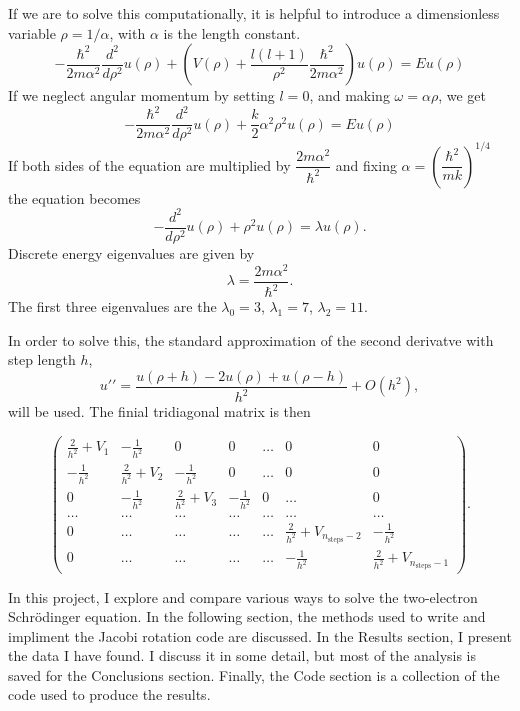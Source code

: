 \documentclass[11pt]{article}
\begin{document}
    If we are to solve this computationally, it is helpful to introduce a dimensionless variable $\rho = 1/\alpha$, with $\alpha$ is the length constant. 
    \[ -\dfrac{\hbar^2}{2m\alpha^2} \dfrac{d^2}{d\rho^2} u(\rho) + \left( V(\rho) + \dfrac{l(l+1)}{\rho^2} \dfrac{\hbar^2}{2m\alpha^2} \right) u(\rho) = Eu(\rho) \]
    If we neglect angular momentum by setting $l=0$, and making $\omega = \alpha \rho$, we get
    \[ -\dfrac{\hbar^2}{2m\alpha^2} \dfrac{d^2}{d\rho^2} u(\rho) + \dfrac{k}{2} \alpha^2 \rho^2 u(\rho) = Eu(\rho) \]
    If both sides of the equation are multiplied by $\dfrac{2m\alpha^2}{\hbar^2}$ and fixing $\alpha = \left( \dfrac{\hbar^2}{mk} \right)^{1/4}$ the equation becomes
    \[ -\dfrac{d^2}{d\rho^2} u(\rho)+ \rho^2 u(\rho) = \lambda u(\rho). \]
    Discrete energy eigenvalues are given by
    \[ \lambda = \dfrac{2m\alpha^2}{\hbar^2}. \]
    The first three eigenvalues are the $\lambda_0 = 3$, $\lambda_1 = 7$, $\lambda_2 = 11$. 

    In order to solve this, the standard approximation of the second derivatve with step length $h$,
    \[ u\prime \prime = \dfrac{u(\rho+h)-2u(\rho)+u(\rho-h)}{h^2} + O(h^2) , \]
    will be used. The finial tridiagonal matrix is then

    \[
    \left( \begin{array}{ccccccc} \frac{2}{h^2}+V_1 & -\frac{1}{h^2} & 0   & 0    & \dots  &0     & 0 \\
    -\frac{1}{h^2} & \frac{2}{h^2}+V_2 & -\frac{1}{h^2} & 0    & \dots  &0     &0 \\
    0   & -\frac{1}{h^2} & \frac{2}{h^2}+V_3 & -\frac{1}{h^2}  &0       &\dots & 0\\
    \dots  & \dots & \dots & \dots  &\dots      &\dots & \dots\\
    0   & \dots & \dots & \dots  &\dots       &\frac{2}{h^2}+V_{n_{\mathrm{steps}}-2} & -\frac{1}{h^2}\\
    0   & \dots & \dots & \dots  &\dots       &-\frac{1}{h^2} & \frac{2}{h^2}+V_{n_{\mathrm{steps}}-1}
    \end{array} \right)  .
    \]

    In this project, I explore and compare various ways to solve the two-electron Schr\"{o}dinger equation. In the following section, the methods used to write and impliment the Jacobi rotation code are discussed. In the Results section, I present the data I have found. I discuss it in some detail, but most of the analysis is saved for the Conclusions section. Finally, the Code section is a collection of the code used to produce the results.
\end{document}
